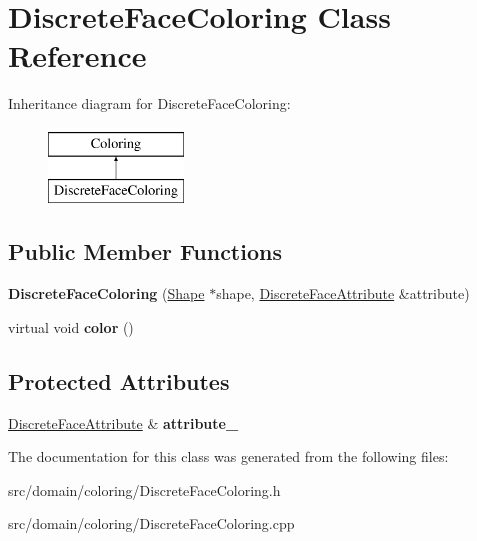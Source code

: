 \hypertarget{class_discrete_face_coloring}{}\section{Discrete\+Face\+Coloring Class Reference}
\label{class_discrete_face_coloring}
Inheritance diagram for Discrete\+Face\+Coloring\+:\begin{figure}[H]
\begin{center}
\leavevmode
\includegraphics[height=2.000000cm]{class_discrete_face_coloring}
\end{center}
\end{figure}
\subsection*{Public Member Functions}
\begin{DoxyCompactItemize}
\item 
\hypertarget{class_discrete_face_coloring_a28b50f0c89173d067489e42fb36373e8}{}{\bfseries Discrete\+Face\+Coloring} (\hyperlink{class_shape}{Shape} $\ast$shape, \hyperlink{class_discrete_face_attribute}{Discrete\+Face\+Attribute} \&attribute)\label{class_discrete_face_coloring_a28b50f0c89173d067489e42fb36373e8}

\item 
\hypertarget{class_discrete_face_coloring_a9949374e0af166fdc322475971e9d612}{}virtual void {\bfseries color} ()\label{class_discrete_face_coloring_a9949374e0af166fdc322475971e9d612}

\end{DoxyCompactItemize}
\subsection*{Protected Attributes}
\begin{DoxyCompactItemize}
\item 
\hypertarget{class_discrete_face_coloring_a665f2316ca228e8c281b5b77eb7196e9}{}\hyperlink{class_discrete_face_attribute}{Discrete\+Face\+Attribute} \& {\bfseries attribute\+\_\+}\label{class_discrete_face_coloring_a665f2316ca228e8c281b5b77eb7196e9}

\end{DoxyCompactItemize}


The documentation for this class was generated from the following files\+:\begin{DoxyCompactItemize}
\item 
src/domain/coloring/Discrete\+Face\+Coloring.\+h\item 
src/domain/coloring/Discrete\+Face\+Coloring.\+cpp\end{DoxyCompactItemize}
